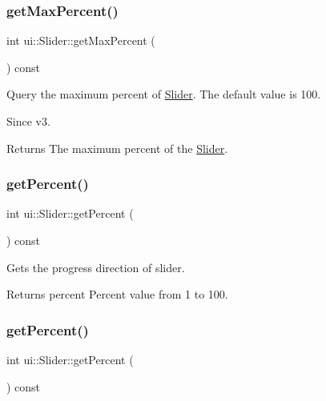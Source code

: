 \subsubsection{\texorpdfstring{get\+Max\+Percent()}{getMaxPercent()}\hspace{0.1cm}{\footnotesize\ttfamily [2/2]}}
{\footnotesize\ttfamily int ui\+::\+Slider\+::get\+Max\+Percent (\begin{DoxyParamCaption}{ }\end{DoxyParamCaption}) const}

Query the maximum percent of \hyperlink{classui_1_1Slider}{Slider}. The default value is 100. \begin{DoxySince}{Since}
v3. 
\end{DoxySince}
\begin{DoxyReturn}{Returns}
The maximum percent of the \hyperlink{classui_1_1Slider}{Slider}. 
\end{DoxyReturn}
\mbox{\label{classui_1_1Slider_ad9612cb3d778733a4d5456ebe3892e44}} 
\subsubsection{\texorpdfstring{get\+Percent()}{getPercent()}\hspace{0.1cm}{\footnotesize\ttfamily [1/2]}}
{\footnotesize\ttfamily int ui\+::\+Slider\+::get\+Percent (\begin{DoxyParamCaption}{ }\end{DoxyParamCaption}) const}

Gets the progress direction of slider.

\begin{DoxyReturn}{Returns}
percent Percent value from 1 to 100. 
\end{DoxyReturn}
\mbox{\label{classui_1_1Slider_ad9612cb3d778733a4d5456ebe3892e44}} 
\subsubsection{\texorpdfstring{get\+Percent()}{getPercent()}\hspace{0.1cm}{\footnotesize\ttfamily [2/2]}}
{\footnotesize\ttfamily int ui\+::\+Slider\+::get\+Percent (\begin{DoxyParamCaption}{ }\end{DoxyParamCaption}) const}

